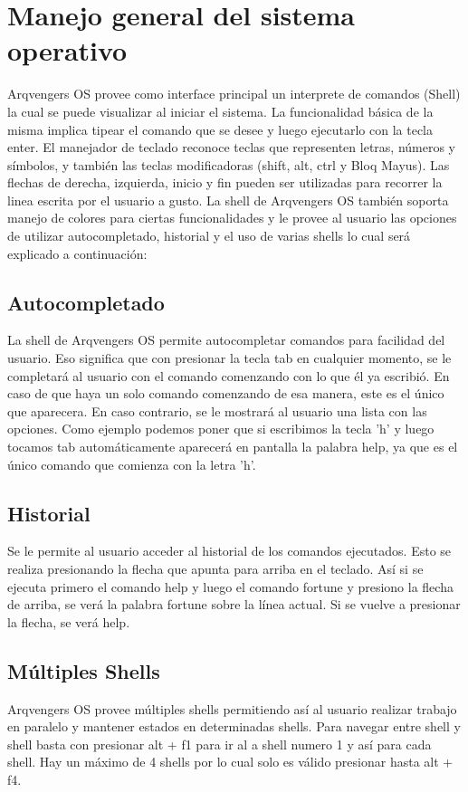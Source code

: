 \documentclass[a4paper,10pt]{article}
\begin{document}
\section{Manejo general del sistema operativo}
    Arqvengers OS provee como interface principal un interprete de comandos (Shell) la cual se puede visualizar al iniciar el sistema. La funcionalidad básica de la misma implica tipear el comando que se desee y luego ejecutarlo con la tecla enter. El manejador de teclado reconoce teclas que representen letras, números y símbolos, y también las teclas modificadoras (shift, alt, ctrl y Bloq Mayus). Las flechas de derecha, izquierda, inicio y fin pueden ser utilizadas para recorrer la linea escrita por el usuario a gusto.
    La shell de Arqvengers OS también soporta manejo de colores para ciertas funcionalidades y le provee al usuario las opciones de utilizar autocompletado, historial y el uso de varias shells lo cual será explicado a continuación:

    \subsection{Autocompletado}
        La shell de Arqvengers OS permite autocompletar comandos para facilidad del usuario. Eso significa que con presionar la tecla tab en cualquier momento, se le completará al usuario con el comando comenzando con lo que él ya escribió. En caso de que haya un solo comando comenzando de esa manera, este es el único que aparecera. En caso contrario, se le mostrará al usuario una lista con las opciones. Como ejemplo podemos poner que si escribimos la tecla 'h' y luego tocamos tab automáticamente aparecerá en pantalla la palabra help, ya que es el único comando que comienza con la letra 'h'.
    \subsection{Historial}
        Se le permite al usuario acceder al historial de los comandos ejecutados. Esto se realiza presionando la flecha que apunta para arriba en el teclado. Así si se ejecuta primero el comando help y luego el comando fortune y presiono la flecha de arriba, se verá la palabra fortune sobre la línea actual. Si se vuelve a presionar la flecha, se verá help.
    \subsection{Múltiples Shells}
        Arqvengers OS provee múltiples shells permitiendo así al usuario realizar trabajo en paralelo y mantener estados en determinadas shells. Para navegar entre shell y shell basta con presionar alt + f1 para ir al a shell numero 1 y así para cada shell. Hay un máximo de 4 shells por lo cual solo es válido presionar hasta alt + f4.
\end{document}
